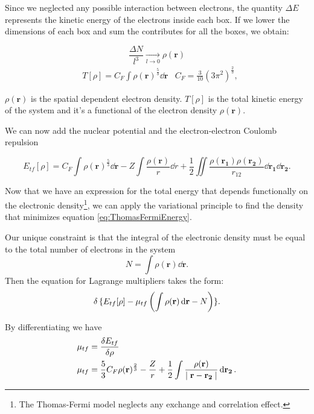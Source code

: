 \documentclass[a4paper,12pt]{article}
\begin{document}
Since we neglected any possible interaction between electrons, the quantity $\Delta E$ represents the kinetic energy of the electrons inside each box.
If we lower the dimensions of each box and sum the contributes for all the boxes, we obtain:

\begin{equation}
	\frac{\Delta N}{l^{3}} \xrightarrow[l\rightarrow0]{} \rho(\mathbf{r})
\end{equation}
\begin{align}
	& T[\rho] = C_{F} \int \rho(\mathbf{r})^{\frac{5}{3}} \dd{\mathbf{r}}
	& C_{F} = \frac{3}{10}(3 \pi^{2})^{\frac{2}{3}}, \label{eq:TFKinetic}
\end{align}

$\rho(\mathbf{r})$ is the spatial dependent electron density. $T[\rho]$ is the total kinetic energy of the system and it's a functional of the electron density $\rho(\mathbf{r})$.

We can now add the nuclear potential and the electron-electron Coulomb repulsion


\begin{equation}\label{eq:ThomasFermiEnergy}
	E_{tf}[\rho] = C_{F} \int \rho(\mathbf{r})^{\frac{5}{3}} \dd{\mathbf{r}} 
			- Z \int \frac{\rho(\mathbf{r})}{r} \dd{r} 
			+ \frac{1}{2} \iint \frac{\rho(\mathbf{r_{1}}) \rho(\mathbf{r_{2}}) }{r_{12}} \dd{\mathbf{r_1}} \dd{\mathbf{r_2}} .
\end{equation}

Now that we have an expression for the total energy that depends functionally on the electronic density\footnote{The Thomas-Fermi model neglects any exchange and correlation effect.}, we can apply the variational principle to find the density that minimizes equation \eqref{eq:ThomasFermiEnergy}.

Our unique constraint is that the integral of the electronic density must be equal to the total number of electrons in the system
\begin{equation}\label{eq:TFDensityConstraint}
	N = \int \rho(\mathbf{r}) \dd{\mathbf{r}} .
\end{equation}
Then the equation for Lagrange multipliers takes the form:
\begin{equation}
	\var{} \lbrace  E_{tf}[\rho] - \mu_{tf} \left( \int \rho(\mathbf{r}) \dd{\mathbf{r}} - N \right) \rbrace.
\end{equation}

By differentiating we have \cite[246-254]{Parr}
\begin{align}
	\mu_{tf} & = \frac{\var{E_{tf}}}{\var{\rho}}  \\
	\mu_{tf} & = \frac{5}{3} C_{F} \rho(\mathbf{r})^{\frac{2}{3}} - \frac{Z}{r} + \frac{1}{2} \int \frac{\rho(\mathbf{r})}{\mid \mathbf{r} - \mathbf{r_2} \mid} \dd{\mathbf{r_2}}. \label{eq:TFEq}
\end{align}
\end{document}
